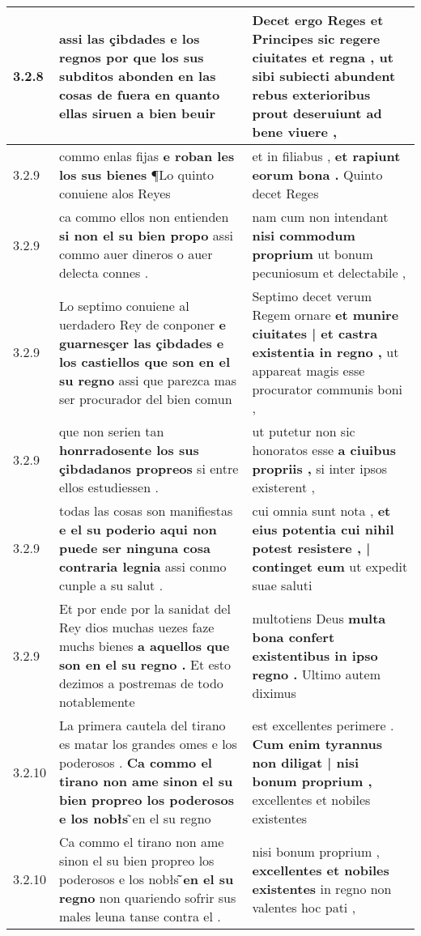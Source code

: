 \begin{tabular}{|p{1cm}|p{6.5cm}|p{6.5cm}|}
3.2.8 & assi las çibdades e los regnos \textbf{ por que los sus subditos abonden en las cosas de fuera } en quanto ellas siruen a bien beuir & Decet ergo Reges et Principes sic regere ciuitates et regna , \textbf{ ut sibi subiecti abundent rebus exterioribus } prout deseruiunt ad bene viuere , \\\hline
3.2.9 & commo enlas fijas \textbf{ e roban les los sus bienes } ¶Lo quinto conuiene alos Reyes & et in filiabus , \textbf{ et rapiunt eorum bona . } Quinto decet Reges \\\hline
3.2.9 & ca commo ellos non entienden \textbf{ si non el su bien propo } assi commo auer dineros o auer delecta connes . & nam cum non intendant \textbf{ nisi commodum proprium } ut bonum pecuniosum et delectabile , \\\hline
3.2.9 & Lo septimo conuiene al uerdadero Rey de conponer \textbf{ e guarnesçer las çibdades e los castiellos que son en el su regno } assi que parezca mas ser procurador del bien comun & Septimo decet verum Regem ornare \textbf{ et munire ciuitates | et castra existentia in regno , } ut appareat magis esse procurator communis boni , \\\hline
3.2.9 & que non serien tan \textbf{ honrradosente los sus çibdadanos propreos } si entre ellos estudiessen . & ut putetur non sic honoratos esse \textbf{ a ciuibus propriis , } si inter ipsos existerent , \\\hline
3.2.9 & todas las cosas son manifiestas \textbf{ e el su poderio aqui non puede ser ninguna cosa contraria legnia } assi conmo cunple a su salut . & cui omnia sunt nota , \textbf{ et eius potentia cui nihil potest resistere , | continget eum } ut expedit suae saluti \\\hline
3.2.9 & Et por ende por la sanidat del Rey dios muchas uezes faze muchs bienes \textbf{ a aquellos que son en el su regno . } Et esto dezimos a postremas de todo notablemente & multotiens Deus \textbf{ multa bona confert existentibus in ipso regno . } Ultimo autem diximus \\\hline
3.2.10 & La primera cautela del tirano es matar los grandes omes e los poderosos . \textbf{ Ca commo el tirano non ame sinon el su bien propreo los poderosos e los nobłs } ̃en el su regno & est excellentes perimere . \textbf{ Cum enim tyrannus non diligat | nisi bonum proprium , } excellentes et nobiles existentes \\\hline
3.2.10 & Ca commo el tirano non ame sinon el su bien propreo los poderosos e los nobłs \textbf{ ̃en el su regno } non quariendo sofrir sus males leuna tanse contra el . & nisi bonum proprium , \textbf{ excellentes et nobiles existentes } in regno non valentes hoc pati , \\\hline

\end{tabular}
